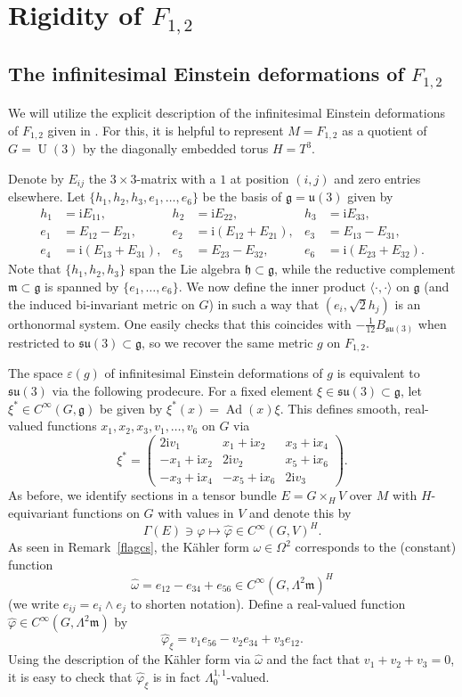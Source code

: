 \documentclass[12pt]{scrartcl}
\theoremstyle{plain}
\theoremstyle{definition}
\newcommand{\Ad}{\operatorname{Ad}}%
\newcommand{\U}{\operatorname{U}}%
\newcommand{\su}{\mathfrak{su}}%
\renewcommand{\u}{\mathfrak{u}}%
\renewcommand{\i}{\mathrm{i}}%
\newcommand{\m}{\mathfrak{m}}%
\newcommand{\h}{\mathfrak{h}}%
\newcommand{\g}{\mathfrak{g}}%
\begin{document}
\section{Rigidity of $F_{1,2}$}
\label{sec:rigidity}

\subsection{The infinitesimal Einstein deformations of $F_{1,2}$}
\label{sec:flagied}

We will utilize the explicit description of the infinitesimal Einstein deformations of $F_{1,2}$ given in \cite[Sec.~6]{hermitianlaplace}. For this, it is helpful to represent $M=F_{1,2}$ as a quotient of $G=\U(3)$ by the diagonally embedded torus $H=T^3$.

Denote by $E_{ij}$ the $3\times 3$-matrix with a $1$ at position $(i,j)$ and zero entries elsewhere. Let $\{h_1,h_2,h_3,e_1,\ldots,e_6\}$ be the basis of $\g=\u(3)$ given by
\begin{align*}
h_1&=\i E_{11},&h_2&=\i E_{22},&h_3&=\i E_{33},\\
e_1&=E_{12}-E_{21},&e_2&=\i(E_{12}+E_{21}),&e_3&=E_{13}-E_{31},\\
e_4&=\i(E_{13}+E_{31}),&e_5&=E_{23}-E_{32},&e_6&=\i(E_{23}+E_{32}).
\end{align*}
Note that $\{h_1,h_2,h_3\}$ span the Lie algebra $\h\subset\g$, while the reductive complement $\m\subset\g$ is spanned by $\{e_1,\ldots,e_6\}$. We now define the inner product $\langle\cdot,\cdot\rangle$ on $\g$ (and the induced bi-invariant metric on $G$) in such a way that $(e_i,\sqrt{2}h_j)$ is an orthonormal system. One easily checks that this coincides with $-\frac{1}{12}B_{\su(3)}$ when restricted to $\su(3)\subset\g$, so we recover the same metric $g$ on $F_{1,2}$.

The space $\varepsilon(g)$ of infinitesimal Einstein deformations of $g$ is equivalent to $\su(3)$ via the following prodecure. For a fixed element $\xi\in\su(3)\subset\g$, let $\xi^\ast\in C^\infty(G,\g)$ be given by $\xi^\ast(x)=\Ad(x)\xi$. This defines smooth, real-valued functions $x_1,x_2,x_3,v_1,\ldots,v_6$ on $G$ via
\[\xi^\ast=\begin{pmatrix}
            2\i v_1&x_1+\i x_2&x_3+\i x_4\\
            -x_1+\i x_2&2\i v_2&x_5+\i x_6\\
            -x_3+\i x_4&-x_5+\i x_6&2\i v_3
           \end{pmatrix}.
\]
As before, we identify sections in a tensor bundle $E=G\times_H V$ over $M$ with $H$-equivariant functions on $G$ with values in $V$ and denote this by
\[\Gamma(E)\ni\varphi\mapsto\hat\varphi\in C^\infty(G,V)^H.\]
As seen in Remark~\ref{flagcs}, the Kähler form $\omega\in\Omega^2$ corresponds to the (constant) function
\[\hat\omega=e_{12}-e_{34}+e_{56}\in C^\infty(G,\Lambda^2\m)^H\]
(we write $e_{ij}=e_i\wedge e_j$ to shorten notation). Define a real-valued function $\hat\varphi\in C^\infty(G,\Lambda^2\m)$ by
\[\hat\varphi_\xi=v_1e_{56}-v_2e_{34}+v_3e_{12}.\]
Using the description of the Kähler form via $\hat\omega$ and the fact that $v_1+v_2+v_3=0$, it is easy to check that $\hat\varphi_\xi$ is in fact $\Lambda^{1,1}_0$-valued.
\end{document}
